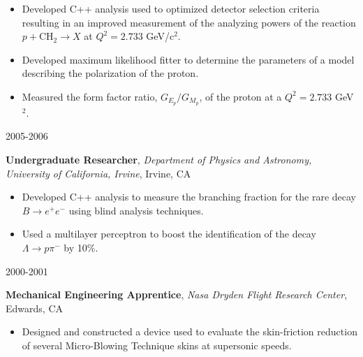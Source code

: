 \documentclass[11pt]{article}
\newcommand{\experienceentry}[5] { 
    \noindent
    \begin{minipage}[t]{0.15\textwidth} \begin{flushright} #1 \end{flushright} \end{minipage} \hspace{0.01\textwidth}
    \begin{minipage}[t]{0.84\textwidth} 
        \textbf{#2}, \emph{#3}, #4 
        #5
    \end{minipage}
}
\begin{document}
                        {
                          \begin{itemize}[label=\textcolor{indigodye}{$\circ$}, noitemsep, nolistsep, leftmargin=*]
                            \item Developed C++ analysis used to optimized detector selection criteria resulting
                                  in an improved measurement of the analyzing powers of the reaction 
                                  $p + \mbox{CH}_2 \rightarrow X$ at $Q^2 = 2.733$ GeV/c$^{2}$.
                            \item Developed maximum likelihood fitter to determine the parameters of a model describing
                                  the polarization of the proton.
                            \item Measured the form factor ratio, $G_{E_p}/G_{M_p}$, of the proton at 
                                  a $Q^{2} = 2.733$ GeV$^{2}$.
                          \end{itemize}
                        } 
        \experienceentry{2005-2006}
                        {Undergraduate Researcher}
                        {Department of Physics and Astronomy, University of California, Irvine}
                        {Irvine, CA}
                        { 
                          \begin{itemize}[label=\textcolor{indigodye}{$\circ$}, noitemsep, nolistsep, leftmargin=*]
                            \item Developed C++ analysis to measure the branching fraction for the rare decay 
                                  $B\rightarrow e^+e^-$ using blind analysis techniques.
                            \item Used a multilayer perceptron to boost the identification of the decay 
                                  $\Lambda \rightarrow p \pi^-$ by 10\%.  
                          \end{itemize}
                       }
        \experienceentry{2000-2001}
                        {Mechanical Engineering Apprentice}
                        {Nasa Dryden Flight Research Center}
                        {Edwards, CA}
                        {
                          \begin{itemize}[label=\textcolor{indigodye}{$\circ$}, noitemsep, nolistsep, leftmargin=*]
                            \item Designed and constructed a device used to evaluate the skin-friction reduction 
                                  of several Micro-Blowing Technique skins at supersonic speeds. 
                          \end{itemize}
                       }
\end{document}

